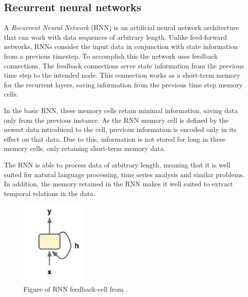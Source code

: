 \subsection{Recurrent neural networks}
\label{section:BT:RNN}

A \textit{Recurrent Neural Network} (RNN) is an artificial neural network architecture that can work with data sequences of arbitrary length.
Unlike feed-forward networks, RNNs consider the input data in conjunction with state information from a previous timestep.
To accomplish this the network uses feedback connections.
The feedback connections serve state information from the previous time step to the intended node.
This connection works as a short-term memory for the recurrent layers, saving information from the previous time step memory cells.

In the basic RNN, these memory cells retain minimal information, saving data only from the previous instance.
As the RNN memory cell is defined by the newest data introduced to the cell, previous information is encoded only in its effect on that data.
Due to this, information is not stored for long in these memory cells, only retaining short-term memory data.



The RNN is able to process data of arbitrary length, meaning that it is well suited for natural language processing, time series analysis and similar problems.
In addition, the memory retained in the RNN makes it well suited to extract temporal relations in the data.

\begin{figure}[h!]
    \centering
    \includegraphics[width=0.3\textwidth]{./sections/BT/figures/RNN_neuron_hands_on.png}
    \hfill
    \caption{Figure of RNN feedback-cell from \cite[p.~472]{Geron2017}.}
    \label{fig:rnn-cell}
\end{figure}



